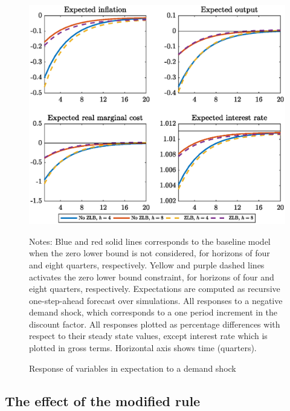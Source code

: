 \documentclass[11pt]{article}
\numberwithin{equation}{section}
\begin{document}
\begin{figure}[H]
	\centering
	\caption{Response of variables in expectation to a demand shock}\label{fig:irfExp_pref}
	\includegraphics[scale=.6]{irfExp_pref}
	\begin{minipage}{\linewidth}
    	\vspace{1mm}
	\footnotesize{{\sc Notes:} Blue and red solid lines corresponds to the baseline model when the zero lower bound is not considered, for horizons of four and eight quarters, respectively. Yellow and purple dashed lines activates the zero lower bound constraint, for horizons of four and eight quarters, respectively. Expectations are computed as recursive one-step-ahead forecast over simulations. All responses to a negative demand shock, which corresponds to a one period increment in the discount factor. All responses plotted as percentage differences with respect to their steady state values, except interest rate which is plotted in gross terms. Horizontal axis shows time (quarters).}
	\end{minipage}
\end{figure}

\subsection{The effect of the modified rule}
\end{document}
